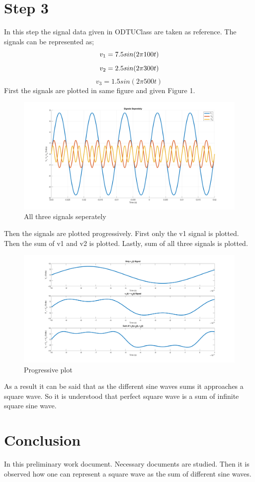 \documentclass[letterpaper,12pt]{article}
\begin{document}
\section{Step 3}
In this step the signal data given in ODTUClass are taken as reference. The signals can be represented as;
\[
v_1 = 7.5 sin(2\pi 100t) \\
\]\[ 
v_2 = 2.5 sin(2\pi 300t) \\
\]\[ 
v_3 = 1.5 sin(2\pi 500t)    
\] 
First the signals are plotted in same figure and given Figure 1.
\begin{figure}[H]
    \centering
    \includegraphics[width=1\textwidth]{3a.png}
    \caption{All three signals seperately}
\end{figure} 
Then the signals are plotted progressively. First only the v1 signal is plotted. Then the sum of v1 and v2 is plotted. Lastly, sum of all three signals is plotted. 
\begin{figure}[H]
    \centering
    \includegraphics[width=1\textwidth]{3b.png}
    \caption{Progressive plot}
\end{figure} 
As a result it can be said that as the different sine waves sums it approaches a square wave. So it is understood that perfect square wave is a sum of infinite square sine wave.

\section{Conclusion}
In this preliminary work document. Necessary documents are studied. Then it is observed how one can represent a square wave as the sum of different sine waves.

\end{document}
